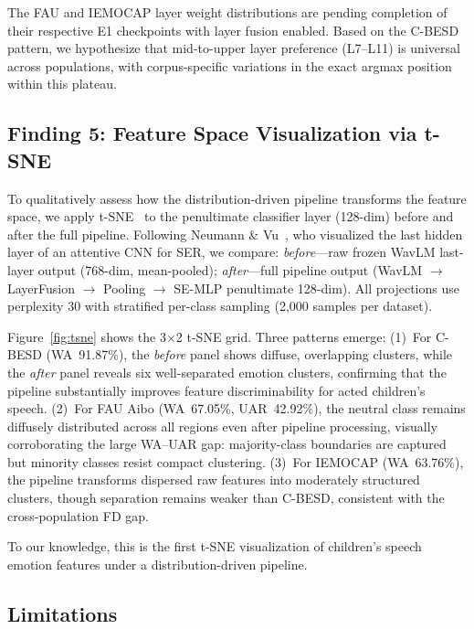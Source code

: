 \documentclass[11pt,a4paper]{article}
\begin{document}
The FAU and IEMOCAP layer weight distributions are pending completion of their
respective E1 checkpoints with layer fusion enabled. Based on the C-BESD
pattern, we hypothesize that mid-to-upper layer preference (L7--L11) is
universal across populations, with corpus-specific variations in the exact
argmax position within this plateau.

\subsection{Finding 5: Feature Space Visualization via t-SNE}
\label{ssec:tsne}

To qualitatively assess how the distribution-driven pipeline transforms the
feature space, we apply t-SNE~\cite{van2008visualizing} to the penultimate
classifier layer (128-dim) before and after the full pipeline. Following
Neumann \& Vu~\cite{neumann2019cross}, who visualized the last hidden layer of
an attentive CNN for SER, we compare: \textit{before}---raw frozen WavLM
last-layer output (768-dim, mean-pooled); \textit{after}---full pipeline output
(WavLM $\rightarrow$ LayerFusion $\rightarrow$ Pooling $\rightarrow$ SE-MLP
penultimate 128-dim). All projections use perplexity 30 with stratified
per-class sampling (2,000 samples per dataset).

Figure~\ref{fig:tsne} shows the 3$\times$2 t-SNE grid. Three patterns emerge:
(1)~For C-BESD (WA~91.87\%), the \textit{before} panel shows diffuse,
overlapping clusters, while the \textit{after} panel reveals six well-separated
emotion clusters, confirming that the pipeline substantially improves feature
discriminability for acted children's speech. (2)~For FAU Aibo (WA~67.05\%,
UAR~42.92\%), the neutral class remains diffusely distributed across all
regions even after pipeline processing, visually corroborating the large
WA--UAR gap: majority-class boundaries are captured but minority classes resist
compact clustering. (3)~For IEMOCAP (WA~63.76\%), the pipeline transforms
dispersed raw features into moderately structured clusters, though separation
remains weaker than C-BESD, consistent with the cross-population FD gap.

To our knowledge, this is the first t-SNE visualization of children's speech
emotion features under a distribution-driven pipeline.

\subsection{Limitations}
\end{document}
